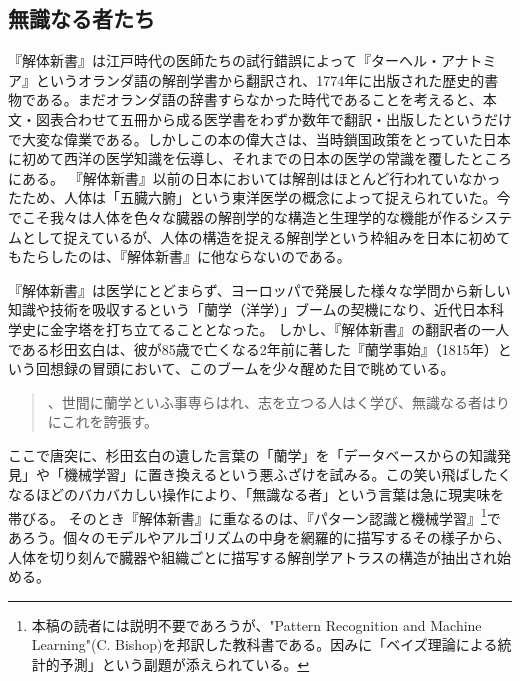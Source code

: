 \subsection{無識なる者たち}
『解体新書』は江戸時代の医師たちの試行錯誤によって『ターヘル・アナトミア』というオランダ語の解剖学書から翻訳され、1774年に出版された歴史的書物である。まだオランダ語の辞書すらなかった時代であることを考えると、本文・図表合わせて五冊から成る医学書をわずか数年で翻訳・出版したというだけで大変な偉業である。しかしこの本の偉大さは、当時鎖国政策をとっていた日本に初めて西洋の医学知識を伝導し、それまでの日本の医学の常識を覆したところにある。
『解体新書』以前の日本においては解剖はほとんど行われていなかったため、人体は「五臓六腑」という東洋医学の概念によって捉えられていた。今でこそ我々は人体を色々な臓器の解剖学的な構造と生理学的な機能が作るシステムとして捉えているが、人体の構造を捉える解剖学という枠組みを日本に初めてもたらしたのは、『解体新書』に他ならないのである。

『解体新書』は医学にとどまらず、ヨーロッパで発展した様々な学問から新しい知識や技術を吸収するという「蘭学（洋学）」ブームの契機になり、近代日本科学史に金字塔を打ち立てることとなった。
しかし、『解体新書』の翻訳者の一人である杉田玄白は、彼が85歳で亡くなる2年前に著した『蘭学事始』（1815年）という回想録の冒頭において、このブームを少々醒めた目で眺めている。

\begin{quote}
、世間に蘭学といふ事専らはれ、志を立つる人はく学び、無識なる者はりにこれを誇張す。
\end{quote}

ここで唐突に、杉田玄白の遺した言葉の「蘭学」を「データベースからの知識発見」や「機械学習」に置き換えるという悪ふざけを試みる。この笑い飛ばしたくなるほどのバカバカしい操作により、「無識なる者」という言葉は急に現実味を帯びる。
そのとき『解体新書』に重なるのは、『パターン認識と機械学習』\footnote{本稿の読者には説明不要であろうが、"Pattern Recognition and Machine Learning"(C. Bishop)を邦訳した教科書である。因みに「ベイズ理論による統計的予測」という副題が添えられている。}であろう。個々のモデルやアルゴリズムの中身を網羅的に描写するその様子から、人体を切り刻んで臓器や組織ごとに描写する解剖学アトラスの構造が抽出され始める。


